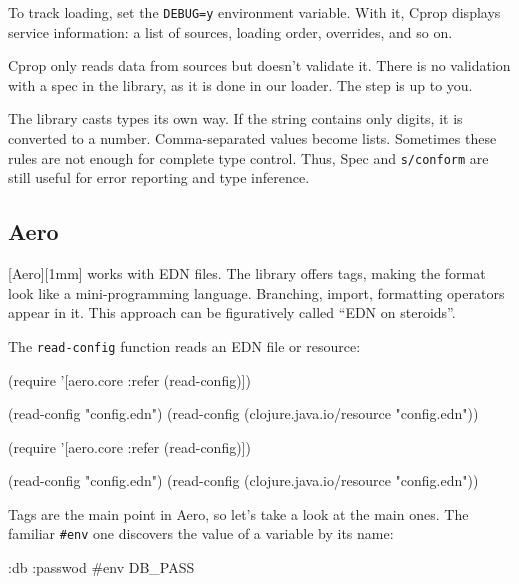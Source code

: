 \fi

To track loading, set the \verb|DEBUG=y| environment variable. With it, Cprop displays service information: a list of sources, loading order, overrides, and so on.

Cprop only reads data from sources but doesn't validate it. There is no validation with a spec in the library, as it is done in our loader. The step is up to you.

The library casts types its own way. If the string contains only digits, it is converted to a number. Comma-separated values become lists. Sometimes these rules are not enough for complete type control. Thus, Spec and \verb|s/conform| are still useful for error reporting and type inference.

\subsection{Aero}


[Aero][1mm] works with EDN files. The library offers tags, making the format look like a mini-programming language. Branching, import, formatting operators appear in it. This approach can be figuratively called ``EDN on steroids''.


The \verb|read-config| function reads an EDN file or resource:

\ifnarrow

\begin{clojure}
(require
  '[aero.core :refer (read-config)])

(read-config "config.edn")
(read-config
  (clojure.java.io/resource
    "config.edn"))
\end{clojure}

\else

\begin{clojure}
(require '[aero.core :refer (read-config)])

(read-config "config.edn")
(read-config (clojure.java.io/resource "config.edn"))
\end{clojure}

\fi


Tags are the main point in Aero, so let's take a look at the main ones. The familiar \verb|#env| one discovers the value of a variable by its name:

\begin{clojure}
{:db {:passwod #env DB_PASS}}
\end{clojure}

